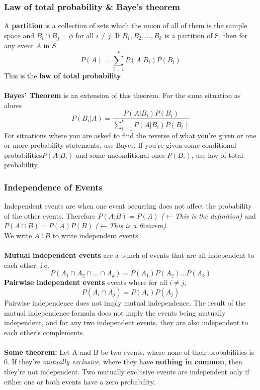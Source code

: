 \documentclass{article}
\begin{document}
\subsubsection{Law of total probability \& Baye's theorem}
A \textbf{partition} is a collection of sets which the union of all of them is the sample space and $B_i\cap B_j = \phi$ for all  $i\neq j$. If $B_1,B_2,...,B_k$ is a partition of S, then for any event $A$ in $S$
\[P(A)=\sum_{i=1}^kP(A|B_i)P(B_i)\]
This is the \textbf{law of total probability}
\\\\
\textbf{Bayes' Theorem} is an extension of this theorem. For the same situation as above
\[P(B_i|A)=\frac{P(A|B_i)P(B_i)}{\sum_{i=1}^{k}P(A|B_i)P(B_i)}\]
For situations where you are asked to find the reverse of what you're given or one or more probability statements, use Bayes. If you're given some conditional probabilities$P(A|B_i)$ and some unconditional ones $P(B_i)$, use law of total probability.

\subsubsection{Independence of Events}
Independent events are when one event occurring does not affect the probability of the other events. Therefore $P(A|B) = P(A)$ \textit{($\leftarrow $This is the definition) }and $P(A\cap B) = P(A)P(B)$ \textit{($\leftarrow $This is a theorem)}.
\\
We write $A \bot B$ to write independent events.
\\\\
\textbf{Mutual independent events} are a bunch of events that are all independent to each other, i.e.
\[P(A_1\cap A_2\cap ... \cap A_k) = P(A_1)P(A_2)...P(A_k)\]
\textbf{Pairwise independent events} events where for all $i\ne j$,
\[P(A_i\cap A_j) = P(A_i)P(A_j)\]
Pairwise independence does not imply mutual independence. The result of the mutual independence formula does not imply the events being mutually independent, and for any two independent events, they are also independent to each other's complements.
\\\\
\textbf{Some theorem: }Let A and B be two events, where none of their probabilities is 0. If they're \textit{mutually exclusive}, where they have \textbf{nothing in common}, then they're not independent. Two mutually exclusive events are independent only if either one or both events have a zero probability.
\end{document}
